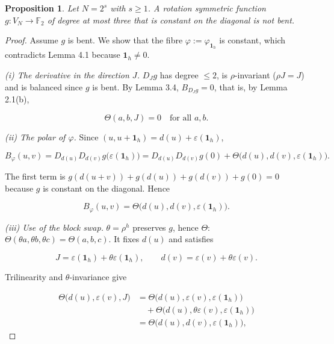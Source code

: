 \documentclass[11pt,reqno]{amsart}
\newtheorem{proposition}[lemma]{Proposition}
\begin{document}
\begin{proposition}
Let $N=2^s$ with $s\ge1$. A rotation symmetric function $g:V_N\to\mathbb F_2$ of degree at most three that is constant on the diagonal is not bent.

\end{proposition}
\begin{proof}
Assume $g$ is bent. We show that the fibre $\varphi:=\varphi_{\mathbf 1_h}$ is constant, which contradicts Lemma 4.1 because $\mathbf 1_h\neq0$.

\emph{(i) The derivative in the direction $J$.} $D_Jg$ has degree $\le2$, is $\rho$-invariant ($\rho J=J$) and is balanced since $g$ is bent. By Lemma 3.4, $B_{D_Jg}=0$, that is, by Lemma 2.1(b),

\begin{equation*}\Theta(a,b,J)=0\quad\text{for all }a,b. \tag{4.1}\end{equation*}


\emph{(ii) The polar of $\varphi$.} Since $(u,u+\mathbf 1_h)=d(u)+\varepsilon(\mathbf 1_h)$,

\begin{equation*}B_\varphi(u,v)=D_{d(u)}D_{d(v)}g\big(\varepsilon(\mathbf 1_h)\big)=D_{d(u)}D_{d(v)}g(0)+\Theta\big(d(u),d(v),\varepsilon(\mathbf 1_h)\big).\end{equation*}

The first term is $g(d(u+v))+g(d(u))+g(d(v))+g(0)=0$ because $g$ is constant on the diagonal. Hence

\begin{equation*}B_\varphi(u,v)=\Theta\big(d(u),d(v),\varepsilon(\mathbf 1_h)\big). \tag{4.2}\end{equation*}


\emph{(iii) Use of the block swap.} $\theta=\rho^h$ preserves $g$, hence $\Theta$: $\Theta(\theta a,\theta b,\theta c)=\Theta(a,b,c)$. It fixes $d(u)$ and satisfies

\begin{equation*}J=\varepsilon(\mathbf 1_h)+\theta\varepsilon(\mathbf 1_h),\qquad d(v)=\varepsilon(v)+\theta\varepsilon(v).\end{equation*}

Trilinearity and $\theta$-invariance give

\begin{equation*}\begin{aligned}\Theta\big(d(u),\varepsilon(v),J\big)&=\Theta\big(d(u),\varepsilon(v),\varepsilon(\mathbf 1_h)\big)\\&\quad+\Theta\big(d(u),\theta\varepsilon(v),\varepsilon(\mathbf 1_h)\big)\\&=\Theta\big(d(u),d(v),\varepsilon(\mathbf 1_h)\big),\end{aligned}\end{equation*}


\end{proof}
\end{document}
